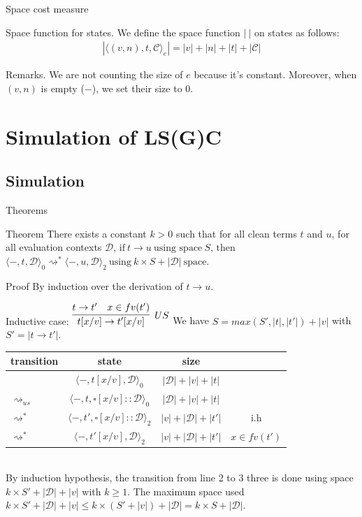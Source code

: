 \documentclass[dvipsnames]{beamer}
\newcommand{\mcd}{\mathcal{D}}
\newcommand{\mcc}{\mathcal{C}}
\newcommand{\ra}{\rightarrow}
\newcommand{\etat}[1]{\langle #1 \rangle}
\newcommand{\etatz}[1]{\langle #1 \rangle_0}
\newcommand{\etatd}[1]{\langle #1 \rangle_2}
\begin{document}
\begin{frame}{Space cost measure}
  \begin{alertblock}{Space function for states.}
  We define the space function $|~|$ on states as follows:
  \begin{align*}
    |\etat{(v, n),t,\mcc}_e| = |v|+|n|+|t|+|\mcc|
  \end{align*}
  \end{alertblock}
  \begin{block}{Remarks.}
   We are not counting the size of $e$ because it's constant. Moreover, when $(v,n)$ is empty ($-$), we set their size to 0. 
  \end{block}
\end{frame}

\section{Simulation of LS(G)C}
\subsection*{Simulation}
 \begin{frame}{Theorems}
   \begin{alertblock}{Theorem}
  There exists a constant $k>0$ such that
  for all clean terms $t$ and $u$, for all evaluation contexts $\mcd$,
    $\text{if}~t \rightarrow u~\text{using space}~S\text{, then}$\\  
    $\etat{-,t,\mcd}_0 \rightsquigarrow^{*} \etat{-,u,\mcd}_2~\text{using}~k\times S+|\mcd|~\text{space.}$
\end{alertblock}
\begin{block}{Proof}
  By induction over the derivation of $t \ra u$.
\end{block}
 \end{frame}

\begin{frame}{Inductive case: $\infer[US]{t[x/v]\rightarrow t'[x/v]}{t \rightarrow t' & x \in fv(t')}$}
      We have $S = max(S',|t|, |t'|)+|v|$ with $S' = | t \rightarrow t'|$.\\
      \begin{tabular}{@{}l c c c@{}}
        \toprule
        transition & state & size \\
        \midrule
                   & $\etatz{-,t[x/v],\mcd}$ & $|\mcd|+|v|+|t|$\\
        $\rightsquigarrow_{us}$ & $ \etatz{-, t, \square[x/v]:: \mcd}$ & $|\mcd| + |v| +|t|$\\ 
        $\rightsquigarrow^{*}$ & $ \etatd{-, t' ,\square[x/v]::\mcd}$ & $|v| + |\mcd|+|t'|$& i.h \\
        $\rightsquigarrow^{*}$ & $ \etatd{-, t'[x/v], \mcd}$ & $|v| + |\mcd|+|t'|$&$x \in fv(t')$\\
        \bottomrule
      \end{tabular}\\
      By induction hypothesis, the transition from line 2 to 3 three is done using space $ k \times S' +|\mcd| + |v|$ with $k\ge 1$. 
      The maximum space used $k \times S' +|\mcd|+|v| \le k \times (S'+|v|)+|\mcd| = k \times S + |\mcd|$.
\end{frame}
\end{document}
